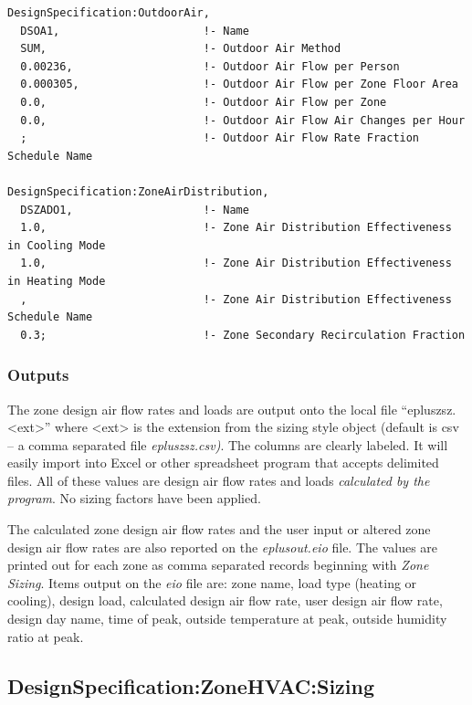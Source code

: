 \begin{lstlisting}
DesignSpecification:OutdoorAir,
  DSOA1,                      !- Name
  SUM,                        !- Outdoor Air Method
  0.00236,                    !- Outdoor Air Flow per Person
  0.000305,                   !- Outdoor Air Flow per Zone Floor Area
  0.0,                        !- Outdoor Air Flow per Zone
  0.0,                        !- Outdoor Air Flow Air Changes per Hour
  ;                           !- Outdoor Air Flow Rate Fraction Schedule Name

DesignSpecification:ZoneAirDistribution,
  DSZADO1,                    !- Name
  1.0,                        !- Zone Air Distribution Effectiveness in Cooling Mode
  1.0,                        !- Zone Air Distribution Effectiveness in Heating Mode
  ,                           !- Zone Air Distribution Effectiveness Schedule Name
  0.3;                        !- Zone Secondary Recirculation Fraction
\end{lstlisting}

\subsubsection{Outputs}\label{outputs-1-007}

The zone design air flow rates and loads are output onto the local file ``epluszsz.\textless{}ext\textgreater{}'' where \textless{}ext\textgreater{} is the extension from the sizing style object (default is csv -- a comma separated file \emph{epluszsz.csv)}. The columns are clearly labeled. It will easily import into Excel or other spreadsheet program that accepts delimited files. All of these values are design air flow rates and loads \emph{calculated by the program}. No sizing factors have been applied.

The calculated zone design air flow rates and the user input or altered zone design air flow rates are also reported on the \emph{eplusout.eio} file. The values are printed out for each zone as comma separated records beginning with \emph{Zone Sizing}. Items output on the \emph{eio} file are: zone name, load type (heating or cooling), design load, calculated design air flow rate, user design air flow rate, design day name, time of peak, outside temperature at peak, outside humidity ratio at peak.

\subsection{DesignSpecification:ZoneHVAC:Sizing}\label{designspecificationzonehvacsizing}

